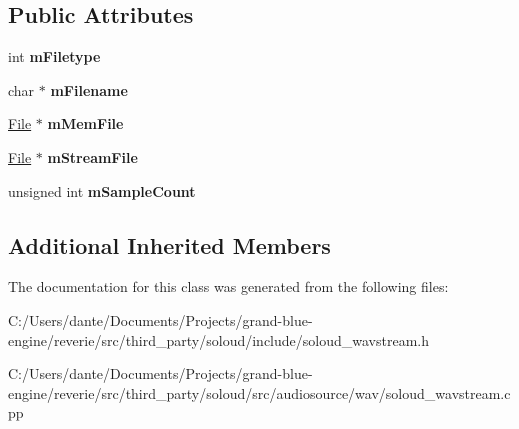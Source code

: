 \subsection*{Public Attributes}
\begin{DoxyCompactItemize}
\item 
\mbox{\label{class_so_loud_1_1_wav_stream_a3eea80d4892a80160ed619a916c58abc}} 
int {\bfseries m\+Filetype}
\item 
\mbox{\label{class_so_loud_1_1_wav_stream_abb044202f928f511f5b8904ea5372915}} 
char $\ast$ {\bfseries m\+Filename}
\item 
\mbox{\label{class_so_loud_1_1_wav_stream_ac6accb9a54740f5f5b4a7931cb880d61}} 
\mbox{\hyperlink{class_so_loud_1_1_file}{File}} $\ast$ {\bfseries m\+Mem\+File}
\item 
\mbox{\label{class_so_loud_1_1_wav_stream_adf01b657b07d0d0e2a26303998f02b02}} 
\mbox{\hyperlink{class_so_loud_1_1_file}{File}} $\ast$ {\bfseries m\+Stream\+File}
\item 
\mbox{\label{class_so_loud_1_1_wav_stream_a2437070c8bbdee98c3bc12380ed4f81f}} 
unsigned int {\bfseries m\+Sample\+Count}
\end{DoxyCompactItemize}
\subsection*{Additional Inherited Members}


The documentation for this class was generated from the following files\+:\begin{DoxyCompactItemize}
\item 
C\+:/\+Users/dante/\+Documents/\+Projects/grand-\/blue-\/engine/reverie/src/third\+\_\+party/soloud/include/soloud\+\_\+wavstream.\+h\item 
C\+:/\+Users/dante/\+Documents/\+Projects/grand-\/blue-\/engine/reverie/src/third\+\_\+party/soloud/src/audiosource/wav/soloud\+\_\+wavstream.\+cpp\end{DoxyCompactItemize}
